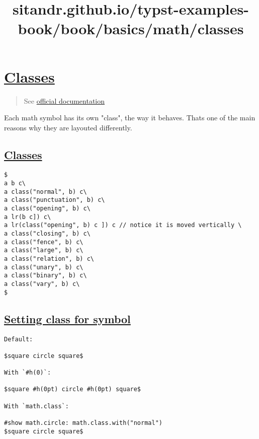 \title{sitandr.github.io/typst-examples-book/book/basics/math/classes}

\section{\texorpdfstring{\hyperref[classes]{Classes}}{Classes}}\label{classes}

\begin{quote}
See \href{https://typst.app/docs/reference/math/class/}{official
documentation}
\end{quote}

Each math symbol has its own "class", the way it behaves.
That\textquotesingle s one of the main reasons why they are layouted
differently.

\subsection{\texorpdfstring{\hyperref[classes-1]{Classes}}{Classes}}\label{classes-1}

\begin{verbatim}
$
a b c\
a class("normal", b) c\
a class("punctuation", b) c\
a class("opening", b) c\
a lr(b c]) c\
a lr(class("opening", b) c ]) c // notice it is moved vertically \
a class("closing", b) c\
a class("fence", b) c\
a class("large", b) c\
a class("relation", b) c\
a class("unary", b) c\
a class("binary", b) c\
a class("vary", b) c\
$
\end{verbatim}

\pandocbounded{}

\subsection{\texorpdfstring{\hyperref[setting-class-for-symbol]{Setting
class for
symbol}}{Setting class for symbol}}\label{setting-class-for-symbol}

\begin{verbatim}
Default:

$square circle square$

With `#h(0)`:

$square #h(0pt) circle #h(0pt) square$

With `math.class`:

#show math.circle: math.class.with("normal")
$square circle square$
\end{verbatim}

\pandocbounded{}
